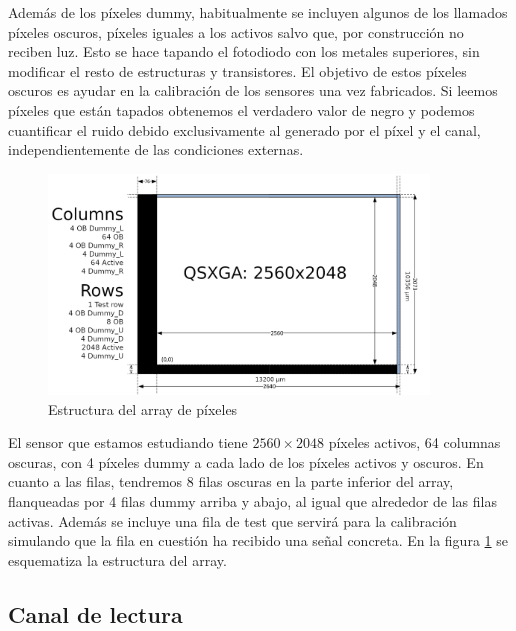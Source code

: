 Además de los píxeles dummy, habitualmente se incluyen algunos de los llamados
píxeles oscuros, píxeles iguales a los activos salvo que, por construcción no
reciben luz. Esto se hace tapando el fotodiodo con los metales superiores,
sin modificar el resto de estructuras y transistores. El objetivo de estos píxeles
oscuros es ayudar en la calibración de los sensores una vez fabricados. Si
leemos píxeles que están tapados obtenemos el verdadero valor de negro y podemos
cuantificar el ruido debido exclusivamente al generado por el píxel y el canal,
independientemente de las condiciones externas.\\

\begin{figure}[h]
	\centering
	\includegraphics[width=0.9\textwidth]{img/pixel_array.png}
	\caption[Estructura del array de píxeles]
	{Estructura del array de píxeles\protect\footnotemark}
	\label{fig:pxa_array}
\end{figure}

El sensor que estamos estudiando tiene $2560\times2048$ píxeles activos, 64 columnas
oscuras, con 4 píxeles dummy a cada lado de los píxeles activos y oscuros.
En cuanto a las filas, tendremos 8 filas oscuras en la parte inferior del array,
flanqueadas por 4 filas dummy arriba y abajo, al igual que alrededor de las filas
activas. Además se incluye una fila de test que servirá para la calibración simulando
que la fila en cuestión ha recibido una señal concreta. En la figura
\ref{fig:pxa_array} se esquematiza la estructura del array.\\

\subsection{Canal de lectura}

